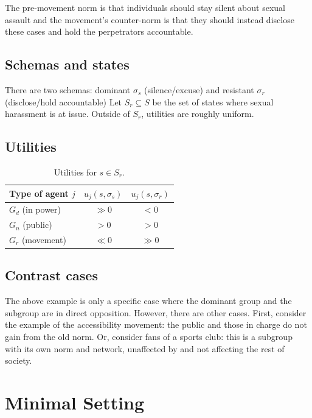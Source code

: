 \documentclass[11pt]{article}
\newcommand{\Gd}{G_{d}}          %
\newcommand{\Gn}{G_{n}}          %
\newcommand{\Gr}{G_{r}}          %
\newcommand{\sd}{\sigma_{s}}     %
\newcommand{\sr}{\sigma_{r}}     %
\theoremstyle{definition}
\theoremstyle{remark}
\begin{document}
The pre-movement norm is that individuals should stay silent about sexual assault and the movement's counter-norm
is that they should instead disclose these cases and hold the perpetrators accountable.

\subsection{Schemas and states}
There are two schemas: dominant $\sd$ (silence/excuse) and resistant $\sigma_r$ (disclose/hold accountable)
Let $S_r \subseteq S$ be the set of states where sexual harassment is at issue. Outside
of $S_r$, utilities are roughly uniform.

\subsection{Utilities}
\begin{table}[h]
\centering
\begin{tabular}{lcc}
\toprule
Type of agent $j$ & $u_j(s,\sd)$ & $u_j(s,\sr)$ \\
\midrule
$\Gd$ (in power)  & $\gg 0$ & $< 0$ \\
$\Gn$ (public)    & $> 0$   & $> 0$ \\
$\Gr$ (movement)  & $\ll 0$ & $\gg 0$ \\
\bottomrule
\end{tabular}
\caption{Utilities for $s \in S_r$.}
\end{table}

\subsection{Contrast cases}
The above example is only a specific case where the dominant group and the subgroup are in direct opposition.
However, there are other cases. First, consider the example of the accessibility
movement: the public and those in charge do not gain from the old norm. Or,
consider fans of a sports club: this is a subgroup with its own norm and network,
unaffected by and not affecting the rest of society.

\section{Minimal Setting}
\end{document}
